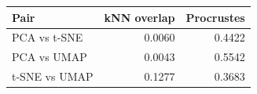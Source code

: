 \begin{tabular}{lrr}
\toprule
Pair & kNN overlap & Procrustes \\
\midrule
PCA vs t-SNE & 0.0060 & 0.4422 \\
PCA vs UMAP & 0.0043 & 0.5542 \\
t-SNE vs UMAP & 0.1277 & 0.3683 \\
\bottomrule
\end{tabular}
